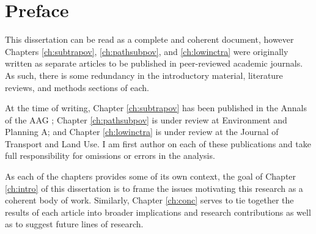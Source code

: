 \documentclass[11 pt, letterpaper]{report}
\begin{document}
\newpage





\tableofcontents


\newpage







\listoffigures

\newpage



\listoftables



\hypersetup{
	colorlinks=true,
	linkcolor=red,
	citecolor=blue,
	urlcolor=blue
}



\newpage


\chapter*{Preface}


This dissertation can be read as a complete and coherent document, however Chapters \ref{ch:subtrapov}, \ref{ch:pathsubpov}, and \ref{ch:lowinctra} were originally written as separate articles to be published in peer-reviewed academic journals. As such, there is some redundancy in the introductory material, literature reviews, and methods sections of each. 

At the time of writing, Chapter \ref{ch:subtrapov} has been published in the Annals of the AAG \cite{allen_suburbanization_2021}; Chapter \ref{ch:pathsubpov} is under review at Environment and Planning A; and Chapter \ref{ch:lowinctra} is under review at the Journal of Transport and Land Use. I am first author on each of these publications and take full responsibility for omissions or errors in the analysis. 

As each of the chapters provides some of its own context, the goal of Chapter \ref{ch:intro} of this dissertation is to frame the issues motivating this research as a coherent body of work. Similarly, Chapter \ref{ch:conc} serves to tie together the results of each article into broader implications and research contributions as well as to suggest future lines of research. 
\end{document}
